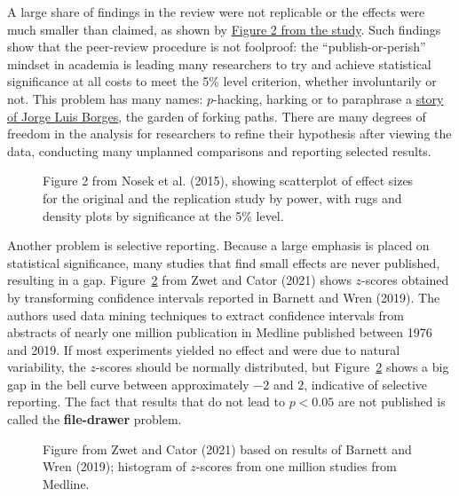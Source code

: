 \documentclass[
  11pt,
  letterpaper,
]{scrbook}
\theoremstyle{definition}
\theoremstyle{definition}
\theoremstyle{remark}
\begin{document}
A large share of findings in the review were not replicable or the
effects were much smaller than claimed, as shown by
\href{https://osf.io/447b3/}{Figure 2 from the study}. Such findings
show that the peer-review procedure is not foolproof: the
``publish-or-perish'' mindset in academia is leading many researchers to
try and achieve statistical significance at all costs to meet the 5\%
level criterion, whether involuntarily or not. This problem has many
names: \(p\)-hacking, harking or to paraphrase a
\href{https://en.wikipedia.org/wiki/The_Garden_of_Forking_Paths}{story
of Jorge Luis Borges}, the garden of forking paths. There are many
degrees of freedom in the analysis for researchers to refine their
hypothesis after viewing the data, conducting many unplanned comparisons
and reporting selected results.

\begin{figure}[ht!]


\caption{\label{fig-repropvaluescorr}Figure 2 from Nosek et al. (2015),
showing scatterplot of effect sizes for the original and the replication
study by power, with rugs and density plots by significance at the 5\%
level.}

\end{figure}%

Another problem is selective reporting. Because a large emphasis is
placed on statistical significance, many studies that find small effects
are never published, resulting in a gap. Figure~\ref{fig-reprozscores}
from Zwet and Cator (2021) shows \(z\)-scores obtained by transforming
confidence intervals reported in Barnett and Wren (2019). The authors
used data mining techniques to extract confidence intervals from
abstracts of nearly one million publication in Medline published between
1976 and 2019. If most experiments yielded no effect and were due to
natural variability, the \(z\)-scores should be normally distributed,
but Figure~\ref{fig-reprozscores} shows a big gap in the bell curve
between approximately \(-2\) and \(2\), indicative of selective
reporting. The fact that results that do not lead to \(p < 0.05\) are
not published is called the \textbf{file-drawer} problem.

\begin{figure}[ht!]


\caption{\label{fig-reprozscores}Figure from Zwet and Cator (2021) based
on results of Barnett and Wren (2019); histogram of \(z\)-scores from
one million studies from Medline.}

\end{figure}%
\end{document}
